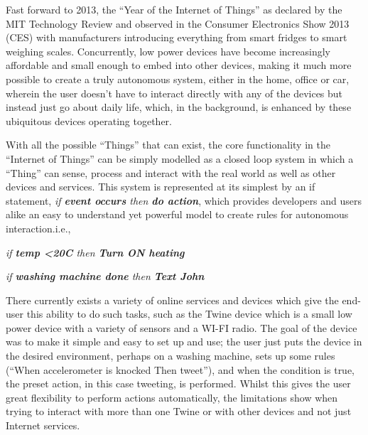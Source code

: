 Fast forward to 2013, the ``Year of the Internet of Things'' as declared by the MIT Technology Review\cite{2013IoT} and observed in the Consumer Electronics Show 2013 (CES) with manufacturers introducing everything from smart fridges to smart weighing scales. Concurrently, low power devices have become increasingly affordable and small enough to embed into other devices, making it much more possible to create a truly autonomous system, either in the home, office or car, wherein the user doesn't have to interact directly with any of the devices but instead just go about daily life, which, in the background, is enhanced by these ubiquitous devices operating together.

With all the possible ``Things'' that can exist, the core functionality in the ``Internet of Things'' can be simply modelled as a closed loop system in which a ``Thing'' can sense, process and interact with the real world as well as other devices and services. This system is represented at its simplest by an if statement, \textit{if \textbf{event occurs} then \textbf{do action}}, which provides developers and users alike an easy to understand yet powerful model to create rules for autonomous interaction.i.e.,
\begin{center}
	\textit{if \textbf{temp \textless  20C} then \textbf{Turn ON heating}}

	\textit{if \textbf{washing machine done} then \textbf{Text John}}
\end{center}

There currently exists a variety of online services and devices which give the end-user this ability to do such tasks, such as the Twine device \cite{Twine} which is a small low power device with a variety of sensors and a WI-FI radio. The goal of the device was to make it simple and easy to set up and use; the user just puts the device in the desired environment, perhaps on a washing machine, sets up some rules (``When accelerometer is knocked Then tweet''), and when the condition is true, the preset action, in this case tweeting, is performed. Whilst this gives the user great flexibility to perform actions automatically, the limitations show when trying to interact with more than one Twine or with other devices and not just Internet services. 

